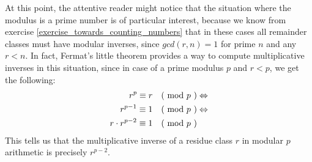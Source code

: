 At this point, the attentive reader might notice that the situation where the modulus is a prime number is of particular interest, because we know from exercise \ref{exercise_towards_counting_numbers} that in these cases all remainder classes must have modular inverses, since $gcd(r,n)=1$ for prime $n$ and any $r<n$. In fact, Fermat's little theorem provides a way to compute multiplicative inverses in this situation, since in case of a prime modulus $p$ and $r<p$, we get the following:
\begin{align*}
r^p \equiv r \quad \text{( mod } p \text{ )} & \Leftrightarrow \\
r^{p-1} \equiv 1 \quad \text{( mod } p \text{ )} & \Leftrightarrow \\
r\cdot r^{p-2} \equiv 1 \quad \text{( mod } p \text{ )}
\end{align*}
This tells us that the multiplicative inverse of a residue class $r$ in modular $p$ arithmetic is precisely $r^{p-2}$.
